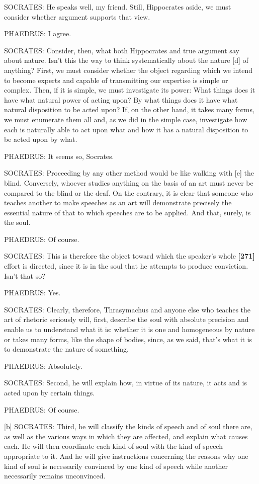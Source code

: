 SOCRATES: He speaks well, my friend. Still, Hippocrates aside, we must
consider whether argument supports that view.

PHAEDRUS: I agree.

SOCRATES: Consider, then, what both Hippocrates and true argument say
about nature. Isn't this the way to think systematically about the
nature {[}d{]} of anything? First, we must consider whether the object
regarding which we intend to become experts and capable of transmitting
our expertise is simple or complex. Then, if it is simple, we must
investigate its power: What things does it have what natural power of
acting upon? By what things does it have what natural disposition to be
acted upon? If, on the other hand, it takes many forms, we must
enumerate them all and, as we did in the simple case, investigate how
each is naturally able to act upon what and how it has a natural
disposition to be acted upon by what.

PHAEDRUS: It seems so, Socrates.

SOCRATES: Proceeding by any other method would be like walking with
{[}e{]} the blind. Conversely, whoever studies anything on the basis of
an art must never be compared to the blind or the deaf. On the contrary,
it is clear that someone who teaches another to make speeches as an art
will demonstrate precisely the essential nature of that to which
speeches are to be applied. And that, surely, is the soul.

PHAEDRUS: Of course.

SOCRATES: This is therefore the object toward which the speaker's whole
{\bf {[}271{]}} effort is directed, since it is in the soul that he
attempts to produce conviction. Isn't that so?

PHAEDRUS: Yes.

SOCRATES: Clearly, therefore, Thrasymachus and anyone else who teaches
the art of rhetoric seriously will, first, describe the soul with
absolute precision and enable us to understand what it is: whether it is
one and homogeneous by nature or takes many forms, like the shape of
bodies, since, as we said, that's what it is to demonstrate the nature
of something.

PHAEDRUS: Absolutely.

SOCRATES: Second, he will explain how, in virtue of its nature, it acts
and is acted upon by certain things.

PHAEDRUS: Of course.

{[}b{]} SOCRATES: Third, he will classify the kinds of speech and of
soul there are, as well as the various ways in which they are affected,
and explain what causes each. He will then coordinate each kind of soul
with the kind of speech appropriate to it. And he will give instructions
concerning the reasons why one kind of soul is necessarily convinced by
one kind of speech while another necessarily remains unconvinced.

